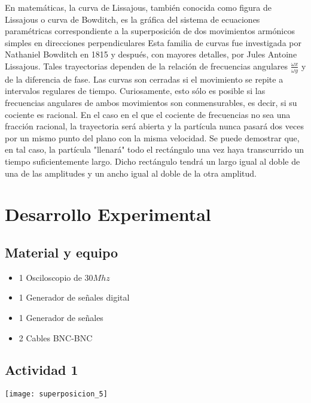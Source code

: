 \documentclass[11pt]{article}
\newenvironment{Figuras}
  {\par\medskip\noindent\minipage{\linewidth}}
  {\endminipage\par\medskip}
\begin{document}
\begin{multicols}{2}
En matemáticas, la curva de Lissajous, también conocida como figura de Lissajous o curva de Bowditch, es la gráfica del sistema de ecuaciones paramétricas correspondiente a la superposición de dos movimientos armónicos simples en direcciones perpendiculares
Esta familia de curvas fue investigada por Nathaniel Bowditch en 1815 y después, con mayores detalles, por Jules Antoine Lissajous.
Tales trayectorias dependen de la relación de frecuencias angulares $\frac{\omega x}{\omega y}$ y de la diferencia de fase.
Las curvas son cerradas si el movimiento se repite a intervalos regulares de tiempo. Curiosamente, esto sólo es posible si las frecuencias angulares de ambos movimientos son conmensurables, es decir, si su cociente es racional.
 En el caso en el que el cociente de frecuencias no sea una fracción racional, la trayectoria será abierta y la partícula nunca pasará dos veces por un mismo punto del plano con la misma velocidad. Se puede demostrar que, en tal caso, la partícula "llenará" todo el rectángulo una vez haya transcurrido un tiempo suficientemente largo. Dicho rectángulo tendrá un largo igual al doble de una de las amplitudes y un ancho igual al doble de la otra amplitud.

\section{Desarrollo Experimental}

	\subsection{Material y equipo}
	\begin{itemize}

		\item 1 Osciloscopio de $30 Mhz$
		\item 1 Generador de señales digital
		\item 1 Generador de señales
		\item 2 Cables BNC-BNC

	\end{itemize}

		\subsection{Actividad 1}

\begin{Figuras}
	\centering
    \texttt{[image: superposicion\_5]}
    \label{fig:mesh5}
\end{Figuras}


\end{multicols}
\end{document}
